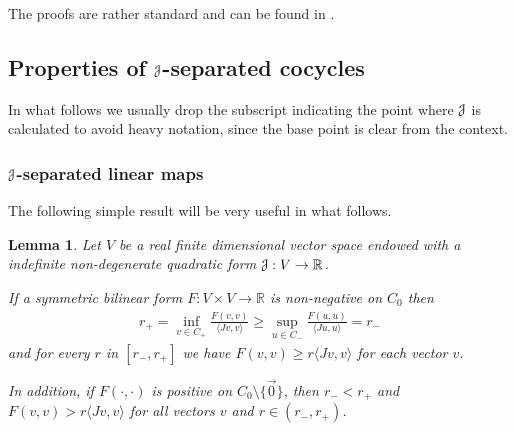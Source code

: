 \documentclass[12pt,reqno]{amsart}
\numberwithin{equation}{section}
\theoremstyle{plain}
\newtheorem{lemma}[theorem]{Lemma}
\theoremstyle{definition}
\newcommand{\RR}{{\mathbb R}}
\newcommand{\J}{\EuScript{J}}
\begin{document}
The proofs are rather standard and can be found in
\cite{Maltsev63}.


\subsection{Properties of $\J$-separated cocycles}
\label{sec:propert-j-separat}

In what follows we usually drop the subscript indicating the
point where $\J$ is calculated to avoid heavy notation,
since the base point is clear from the context.

\subsubsection{$\J$-separated linear maps}
\label{sec:j-separat-linear}



The following simple result will be very useful in what follows.

\begin{lemma}
  \label{le:kuhne}
  Let $V$ be a real finite dimensional vector space endowed
  with a indefinite non-degenerate quadratic form
  $\J:V\to\RR$.

If a symmetric bilinear form $F:V\times V\to\RR$ is
non-negative on $C_0$ then
\begin{align*}
  r_+=\inf_{v\in C_+} \frac{F(v,v)}{\langle Jv,v\rangle}
  \ge \sup_{u\in C_-}\frac{F(u,u)}{\langle Ju,u\rangle}=r_-
\end{align*}
and for every $r$ in $[r_-,r_+]$ we have
$F(v,v)\ge r\langle Jv,v\rangle$ for each vector $v$.

In addition, if $F(\cdot,\cdot)$ is positive on
$C_0\setminus\{\vec0\}$, then $r_-<r_+$ and $F(v,v)>
r\langle Jv,v\rangle$ for all vectors $v$ and $r\in(r_-,r_+)$.
\end{lemma}
\end{document}
